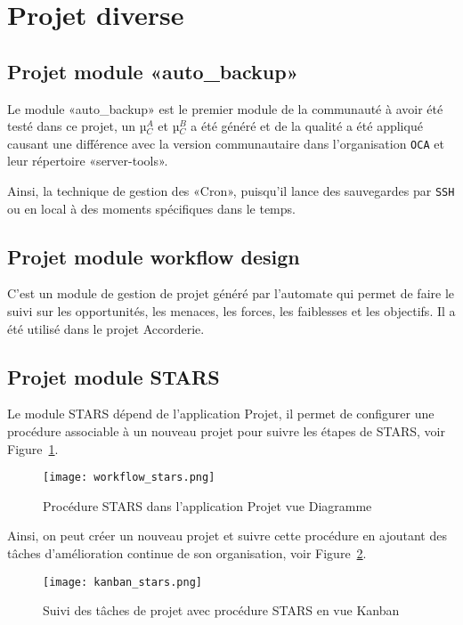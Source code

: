 \section{Projet diverse}

\subsection{Projet module «auto\_backup»}

Le module «auto\_backup» est le premier module de la communauté à avoir été testé dans ce projet, un µ$_C^A$ et µ$_C^B$ a été généré et de la qualité a été appliqué causant une différence avec la version communautaire dans l’organisation \texttt{OCA} et leur répertoire «server-tools».

Ainsi, la technique de gestion des «Cron», puisqu’il lance des sauvegardes par \texttt{SSH} ou en local à des moments spécifiques dans le temps.

\subsection{Projet module workflow design}

C’est un module de gestion de projet généré par l’automate qui permet de faire le suivi sur les opportunités, les menaces, les forces, les faiblesses et les objectifs. Il a été utilisé dans le projet Accorderie.

\subsection{Projet module STARS}

Le module STARS dépend de l’application Projet, il permet de configurer une procédure associable à un nouveau projet pour suivre les étapes de STARS, voir Figure~\ref{fig:workflow_stars}.

\begin{figure}
\centering
\texttt{[image: workflow\_stars.png]}
\caption{Procédure STARS dans l'application Projet vue Diagramme}
\label{fig:workflow_stars}
\end{figure}

Ainsi, on peut créer un nouveau projet et suivre cette procédure en ajoutant des tâches d'amélioration continue de son organisation, voir Figure~\ref{fig:kanban_stars}.

\begin{figure}
\centering
\texttt{[image: kanban\_stars.png]}
\caption{Suivi des tâches de projet avec procédure STARS en vue Kanban}
\label{fig:kanban_stars}
\end{figure}

